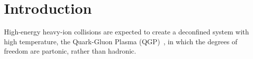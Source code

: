 
\section{Introduction}%
\label{Sec:Introduction}

High-energy heavy-ion collisions are expected to create a deconfined system with high temperature, the Quark-Gluon Plasma (QGP)~\cite{Rafelski:126179, Satz:2000bn, Shuryak:1983ni, Jacak:2012dx, Cleymans:1985wb, Bass:1998vz, BraunMunzinger:2007zz}, in which the degrees of freedom are partonic, rather than hadronic.
